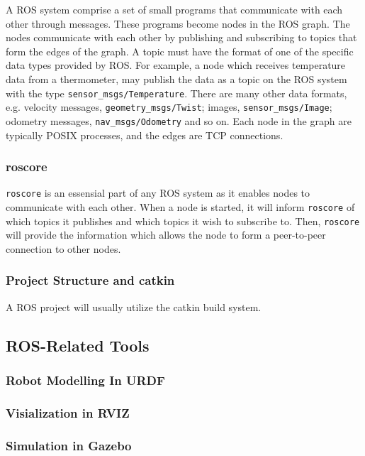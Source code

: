 A \ac{ROS} system comprise a set of small programs that communicate with each other through messages. These programs become nodes in the \ac{ROS} graph. The nodes communicate with each other by publishing and subscribing to topics that form the edges of the graph. A topic must have the format of one of the specific data types provided by \ac{ROS}. For example, a node which receives temperature data from a thermometer, may publish the data as a topic on the \ac{ROS} system with the type \texttt{sensor\_msgs/Temperature}. There are many other data formats, e.g. velocity messages, \texttt{geometry\_msgs/Twist}; images, \texttt{sensor\_msgs/Image}; odometry messages, \texttt{nav\_msgs/Odometry} and so on. Each node in the graph are typically POSIX processes, and the edges are TCP connections\cite{rosbook15}.

\subsubsection{roscore}

\texttt{roscore} is an essensial part of any \ac{ROS} system as it enables nodes to communicate with each other. When a node is started, it will inform \texttt{roscore} of which topics it publishes and which topics it wish to subscribe to. Then, \texttt{roscore} will provide the information which allows the node to form a peer-to-peer connection to other nodes.

\subsubsection{Project Structure and catkin}

A \ac{ROS} project will usually utilize the catkin build system.



\subsection{ROS-Related Tools}

\subsubsection{Robot Modelling In URDF}

\subsubsection{Visialization in RVIZ}

\subsubsection{Simulation in Gazebo}

